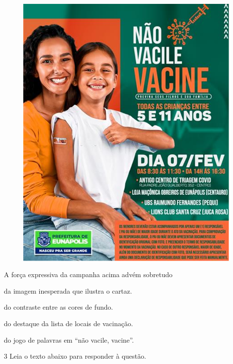 \begin{figure}[H]
\centering\includegraphics[width=.5\textwidth]{imgSAEB_7_POR/media/image24.png}
\end{figure}



A força expressiva da campanha acima advém sobretudo 

\begin{escolha}
    
    \item da imagem inesperada que ilustra o cartaz.
    
    \item do contraste entre as cores de fundo. 
    
    \item do destaque da lista de locais de vacinação. 
    
    \item do jogo de palavras em ``não vacile, vacine''.

\end{escolha}

\num{3} Leia o texto abaixo para responder à questão. 

